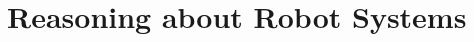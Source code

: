 \documentclass{llncs}
\def\MRTL{\textsf{MRTL}}
\def\nat{\mathbb{N}}
\newcommand{\tup}[1]{\overline{#1}}
\newcommand{\tpl}[1]{\left<{#1}\right>}
\newcommand{\sr}[1]{\footnote{{\color{red} Note. #1}}}
\renewcommand{\sr}[1]{}
\begin{document}







\vspace{-1mm}

\section{Reasoning about Robot Systems}
\vspace{-1mm}
\end{document}
